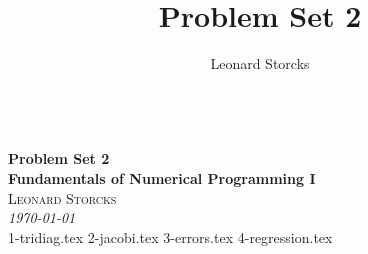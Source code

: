 \documentclass[a4paper, 12pt]{article}
\title{Problem Set 2}
\author{Leonard Storcks}
\theoremstyle{definition}
\begin{document}
\pagestyle{plain}
{\noindent\Huge\bf  \\[0.5\baselineskip] {\selectfont  Problem Set 2}}\\[2\baselineskip]
{ {\bf {}\selectfont Fundamentals of Numerical Programming I}\\
{\textsc{Leonard Storcks}} \\
{\textit{\selectfont     \today}}}
\\[1.4\baselineskip] 


{1-tridiag.tex}
{2-jacobi.tex}
{3-errors.tex}
{4-regression.tex}


\pagebreak
\thispagestyle{plain}
\printbibliography[title={References}]
\pagebreak

\end{document}
